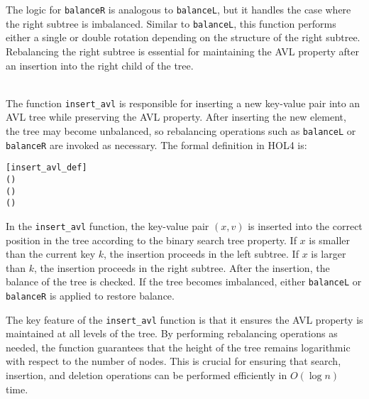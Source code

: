 \documentclass[12pt]{article}
\begin{document}
\begin{description}
  The logic for \texttt{balanceR} is analogous to \texttt{balanceL}, but it handles the case where the right subtree is imbalanced. Similar to \texttt{balanceL}, this function performs either a single or double rotation depending on the structure of the right subtree. Rebalancing the right subtree is essential for maintaining the AVL property after an insertion into the right child of the tree.

  \item[\textbf{insert\_avl}] \\
  The function \texttt{insert\_avl} is responsible for inserting a new key-value pair into an AVL tree while preserving the AVL property. After inserting the new element, the tree may become unbalanced, so rebalancing operations such as \texttt{balanceL} or \texttt{balanceR} are invoked as necessary. The formal definition in HOL4 is:

\begin{alltt}
[insert_avl_def]
    \HOLTokenDefEquality{}   
   (     ) \HOLTokenDefEquality{}
    \HOLSymConst{=}        
     \HOLSymConst{\HOLTokenLt{}}      (   ) 
       (   )
\end{alltt}

  In the \texttt{insert\_avl} function, the key-value pair \( (x, v) \) is inserted into the correct position in the tree according to the binary search tree property. If \( x \) is smaller than the current key \( k \), the insertion proceeds in the left subtree. If \( x \) is larger than \( k \), the insertion proceeds in the right subtree. After the insertion, the balance of the tree is checked. If the tree becomes imbalanced, either \texttt{balanceL} or \texttt{balanceR} is applied to restore balance.

  The key feature of the \texttt{insert\_avl} function is that it ensures the AVL property is maintained at all levels of the tree. By performing rebalancing operations as needed, the function guarantees that the height of the tree remains logarithmic with respect to the number of nodes. This is crucial for ensuring that search, insertion, and deletion operations can be performed efficiently in \( O(\log n) \) time.

\end{description}
\end{document}
